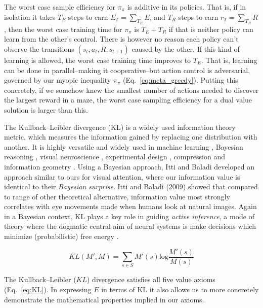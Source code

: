 \documentclass[9pt,twocolumn,twoside]{pnas-new}
\begin{document}
The worst case sample efficiency for $\pi_{\pi}$ is additive in its policies. That is, if in isolation it takes $T_E$ steps to earn $E_{T} = \sum_{T_E} E$, and $T_R$ steps to earn $r_{T} = \sum_{T_R} R$, then the worst case training time for $\pi_{\pi}$ is $T_E + T_R$ if that is neither policy can learn from the other's control. There is however no reason each policy can't observe the transitions $(s_t, a_t, R, s_{t+1})$ caused by the other. If this kind of learning is allowed, the worst case training time improves to $T_E$. That is, learning can be done in parallel--making it cooperative--but action control is adversarial, governed by our myopic inequality $\pi_{\pi}$ (Eq.~\ref{eq:meta_greedy}). Putting this concretely, if we somehow knew the smallest number of actions needed to discover the largest reward in a maze, the worst case sampling efficiency for a dual value solution is larger than this.

The Kullback--Leibler divergence (KL) is a widely used information theory metric, which measures the information gained by replacing one distribution with another. It is highly versatile and widely used in machine learning \cite{Goodfellow-et-al-2016}, Bayesian reasoning \cite{Itti2009,Friston2016}, visual neuroscience \cite{Itti2009}, experimental design \cite{Lopez-Fidalgo2007}, compression \cite{Mackay,Still2012} and information geometry \cite{Ay2015}. Using a Bayesian approach, Itti and Baladi \citep{Itti2009} developed an approach similar to ours for visual attention, where our information value is identical to their \textit{Bayesian surprise}. Itti and Baladi (2009) showed that compared to range of other theoretical alternative, information value most strongly correlates with eye movements made when humans look at natural images. Again in a Bayesian context, KL plays a key role in guiding \textit{active inference}, a mode of theory where the dogmatic central aim of neural systems is make decisions which minimize (probabilistic) free energy \cite{Friston2016,Schwartenbeck2019}. 

\begin{equation}
    KL(M', M) = \sum_{s \in S} M'(s) \text{log} \frac{M'(s)}{M(s)} 
    \label{eq:KL}
\end{equation}

The Kullback--Leibler ($KL$) divergence satisfies all five value axioms (Eq.~\ref{eq:KL}). In expressing $E$ in terms of KL it also allows us to more concretely demonstrate the mathematical properties implied in our axioms.

\end{document}
